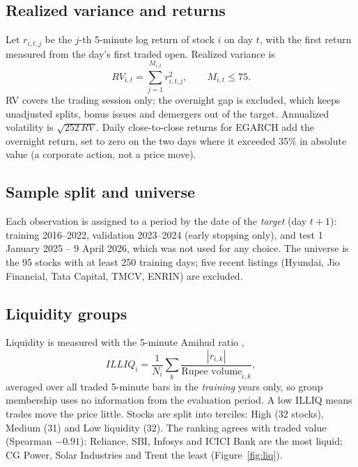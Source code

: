 \documentclass[11pt,a4paper]{article}
\begin{document}
\subsection{Realized variance and returns}

Let $r_{i,t,j}$ be the $j$-th 5-minute log return of stock $i$ on day $t$, with the first return measured
from the day's first traded open. Realized variance is
\begin{equation}
RV_{i,t}=\sum_{j=1}^{M_{i,t}} r_{i,t,j}^{2}, \qquad M_{i,t}\le 75 .
\end{equation}
RV covers the trading session only; the overnight gap is excluded, which keeps unadjusted splits,
bonus issues and demergers out of the target. Annualized volatility is $\sqrt{252\,RV}$. Daily
close-to-close returns for EGARCH add the overnight return, set to zero on the two days where it
exceeded 35\% in absolute value (a corporate action, not a price move).

\subsection{Sample split and universe}

Each observation is assigned to a period by the date of the \emph{target} (day $t+1$): training
2016--2022, validation 2023--2024 (early stopping only), and test 1 January 2025 -- 9 April 2026,
which was not used for any choice. The universe is the 95 stocks with at least 250 training days;
five recent listings (Hyundai, Jio Financial, Tata Capital, TMCV, ENRIN) are excluded.

\subsection{Liquidity groups}

Liquidity is measured with the 5-minute Amihud ratio \citep{amihud2002},
\begin{equation}
ILLIQ_i=\frac{1}{N_i}\sum_{k}\frac{|r_{i,k}|}{\text{Rupee volume}_{i,k}},
\end{equation}
averaged over all traded 5-minute bars in the \emph{training} years only, so group membership uses
no information from the evaluation period. A low ILLIQ means trades move the price little. Stocks are
split into terciles: High (32 stocks), Medium (31) and Low liquidity (32). The ranking agrees with
traded value (Spearman $-0.91$): Reliance, SBI, Infosys and ICICI Bank are the most liquid; CG Power,
Solar Industries and Trent the least (Figure~\ref{fig:liq}).
\end{document}
